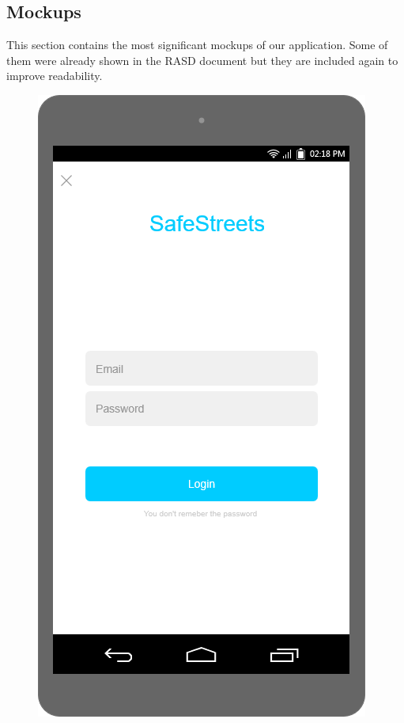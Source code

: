 \documentclass[./main.tex]{subfiles}
\begin{document}
\newcommand{\mockupdimension}{0.36\textwidth}

\subsection{Mockups}
This section contains the most significant mockups of our application. Some of them were already shown in the RASD document but they are included again to improve readability. 

\vfill
\begin{figure}[h]
    \begin{minipage}[t]{\mockupdimension}
        \includegraphics[width=\textwidth]{resources/Mockups/login}

\end{minipage}
\end{figure}
\end{document}

